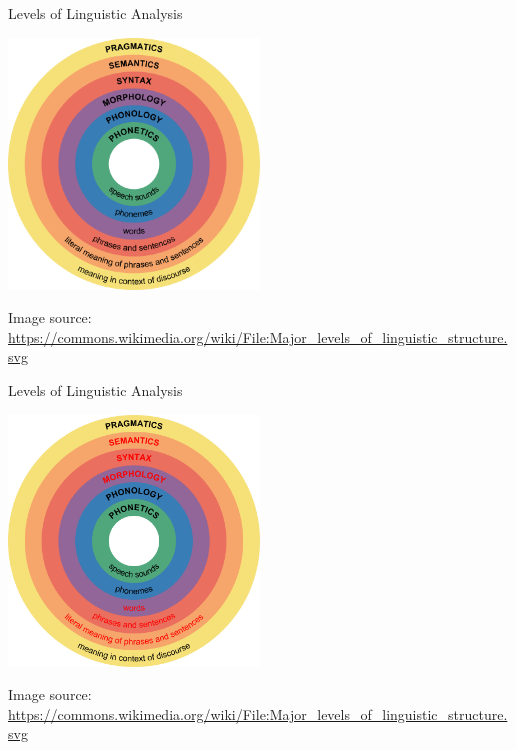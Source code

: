 \begin{frame}{Levels of Linguistic Analysis}
	\vspace{-15pt}
	
  \begin{center}
  	\includegraphics[width=0.5\textwidth]{figures/levels}
  \end{center}
   
{  \tiny
  Image source: \url{https://commons.wikimedia.org/wiki/File:Major_levels_of_linguistic_structure.svg}
 } 

\end{frame}



\begin{frame}{Levels of Linguistic Analysis}
	\vspace{-15pt}
	
  \begin{center}
  	\includegraphics[width=0.5\textwidth]{figures/levels2}
  \end{center}
   
{  \tiny
  Image source: \url{https://commons.wikimedia.org/wiki/File:Major_levels_of_linguistic_structure.svg}
 } 

\end{frame}




